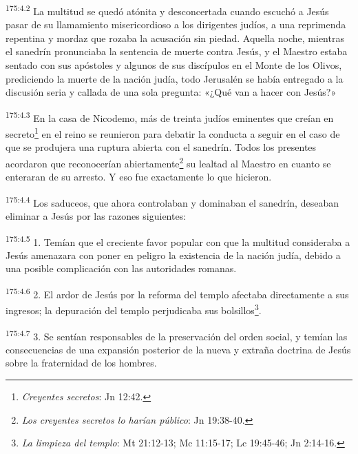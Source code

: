 \par 
\textsuperscript{175:4.2} La multitud se quedó atónita y desconcertada cuando escuchó a Jesús pasar de su llamamiento misericordioso a los dirigentes judíos, a una reprimenda repentina y mordaz que rozaba la acusación sin piedad. Aquella noche, mientras el sanedrín pronunciaba la sentencia de muerte contra Jesús, y el Maestro estaba sentado con sus apóstoles y algunos de sus discípulos en el Monte de los Olivos, prediciendo la muerte de la nación judía, todo Jerusalén se había entregado a la discusión seria y callada de una sola pregunta: «¿Qué van a hacer con Jesús?»

\par 
\textsuperscript{175:4.3} En la casa de Nicodemo, más de treinta judíos eminentes que creían en secreto\footnote{\textit{Creyentes secretos}: Jn 12:42.} en el reino se reunieron para debatir la conducta a seguir en el caso de que se produjera una ruptura abierta con el sanedrín. Todos los presentes acordaron que reconocerían abiertamente\footnote{\textit{Los creyentes secretos lo harían público}: Jn 19:38-40.} su lealtad al Maestro en cuanto se enteraran de su arresto. Y eso fue exactamente lo que hicieron.

\par 
\textsuperscript{175:4.4} Los saduceos, que ahora controlaban y dominaban el sanedrín, deseaban eliminar a Jesús por las razones siguientes:

\par 
\textsuperscript{175:4.5} 1. Temían que el creciente favor popular con que la multitud consideraba a Jesús amenazara con poner en peligro la existencia de la nación judía, debido a una posible complicación con las autoridades romanas.

\par 
\textsuperscript{175:4.6} 2. El ardor de Jesús por la reforma del templo afectaba directamente a sus ingresos; la depuración del templo perjudicaba sus bolsillos\footnote{\textit{La limpieza del templo}: Mt 21:12-13; Mc 11:15-17; Lc 19:45-46; Jn 2:14-16.}.

\par 
\textsuperscript{175:4.7} 3. Se sentían responsables de la preservación del orden social, y temían las consecuencias de una expansión posterior de la nueva y extraña doctrina de Jesús sobre la fraternidad de los hombres.

